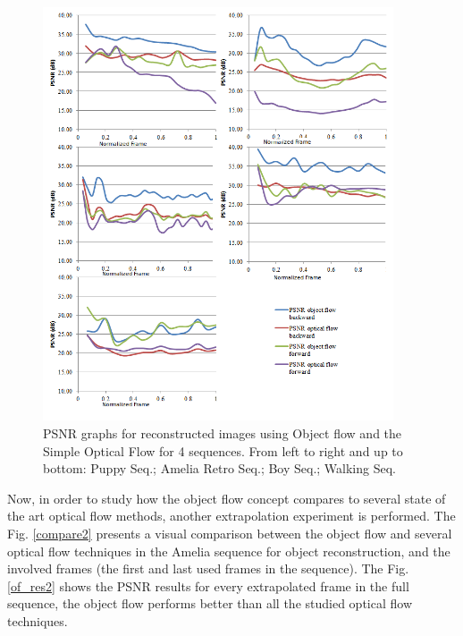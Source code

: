    \begin{figure}[hb]
      \centering
      \includegraphics[width=0.925\textwidth]{../images/psnr_v2.png}
      \caption{PSNR graphs for reconstructed images using Object flow and the Simple Optical Flow for 4 sequences. From left to right and up to bottom: Puppy Seq.; Amelia Retro Seq.; Boy Seq.; Walking Seq.}
      \label{of_res}
   \end{figure}


Now, in order to study how the object flow concept compares to several state of the art optical flow 
methods, another extrapolation experiment is performed. 
The Fig. \ref{compare2} presents a visual comparison between the object flow and several optical flow 
techniques in the Amelia sequence for object reconstruction, and the involved frames (the first and last used frames in the sequence). 
The Fig. \ref{of_res2} shows the PSNR results for every extrapolated frame in the full sequence, 
the object flow performs better than all the studied optical flow techniques.



